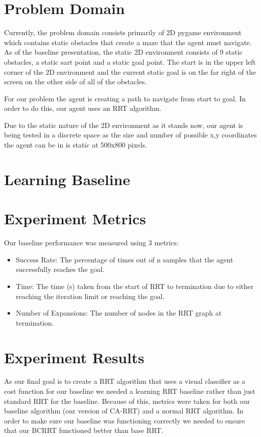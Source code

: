 \documentclass{article}
\begin{document}
\section{Problem Domain}

Currently, the problem domain consists primarily of 2D pygame environment which contains static obstacles that create a maze that the agent must navigate. As of the baseline presentation, the static 2D environment consists of 9 static obstacles, a static sart point and a static goal point. The start is in the upper left corner of the 2D environment and the current static goal is on the far right of the screen on the other side of all of the obstacles.

For our problem the agent is creating a path to navigate from start to goal. In order to do this, our agent uses an RRT algorithm.

Due to the static nature of the 2D environment as it stands now, our agent is being tested in a discrete space as the size and number of possible x,y coordinates the agent can be in is static at 500x800 pixels.

\section{Learning Baseline}


\section{Experiment Metrics}

Our baseline performance was measured using 3 metrics:
\begin{itemize}
	\item{Success Rate: The percentage of times out of n samples that the agent successfully reaches the goal.}
	\item{Time: The time (s) taken from the start of RRT to termination due to either reaching the iteration limit or reaching the goal.}
	\item{Number of Expansions: The number of nodes in the RRT graph at termination.}
\end{itemize}

\section{Experiment Results}

As our final goal is to create a RRT algorithm that uses a visual classifier as a cost function for our baseline we needed a learning RRT baseline rather than just standard RRT for the baseline. Because of this, metrics were taken for both our baseline algorithm (our version of CA-RRT) and a normal RRT algorithm. In order to make sure our baseline was functioning correctly we needed to ensure that our BCRRT functioned better than base RRT.
\end{document}
